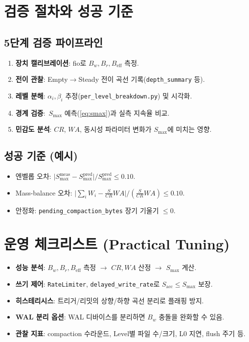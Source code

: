 \documentclass[11pt,a4paper]{article}
\begin{document}
\section{검증 절차와 성공 기준}
\subsection{5단계 검증 파이프라인}
\begin{enumerate}
    \item \textbf{장치 캘리브레이션}: fio로 \(B_w,B_r,B_{\text{eff}}\) 측정.
    \item \textbf{전이 관찰}: Empty\(\rightarrow\)Steady 전이 곡선 기록(\texttt{depth\_summary} 등).
    \item \textbf{레벨 분해}: \(\alpha_i,\beta_i\) 추정(\texttt{per\_level\_breakdown.py}) 및 시각화.
    \item \textbf{경계 검증}: \(\,S_{\max}\) 예측(\cref{eq:smax})과 실측 지속율 비교.
    \item \textbf{민감도 분석}: \(CR\), \(WA\), 동시성 파라미터 변화가 \(S_{\max}\)에 미치는 영향.
\end{enumerate}

\subsection{성공 기준 (예시)}
\begin{itemize}
  \item 엔벨롭 오차: \(\bigl|S_{\max}^{\text{meas}}-S_{\max}^{\text{pred}}\bigr|/S_{\max}^{\text{pred}}\le 0.10\).
  \item Mass-balance 오차: \(\bigl|\sum_i W_i - \tfrac{S}{CR}WA\bigr|/(\tfrac{S}{CR}WA)\le 0.10\).
  \item 안정화: \texttt{pending\_compaction\_bytes} 장기 기울기 \(\le 0\).
\end{itemize}

\section{운영 체크리스트 (Practical Tuning)}
\begin{itemize}
  \item \textbf{성능 분석}: \(B_w,B_r,B_{\text{eff}}\) 측정 \(\rightarrow\) \(CR,WA\) 산정 \(\rightarrow\) \(S_{\max}\) 계산.
  \item \textbf{쓰기 제어}: \texttt{RateLimiter}, \texttt{delayed\_write\_rate}로 \(S_{\text{acc}}\le S_{\max}\) 보장.
  \item \textbf{히스테리시스}: 트리거/리밋의 상향/하향 곡선 분리로 플래핑 방지.
  \item \textbf{WAL 분리 옵션}: WAL 디바이스를 분리하면 \(B_w\) 충돌을 완화할 수 있음.
  \item \textbf{관찰 지표}: compaction 수라운드, Level별 파일 수/크기, L0 지연, flush 주기 등.
\end{itemize}
\end{document}

